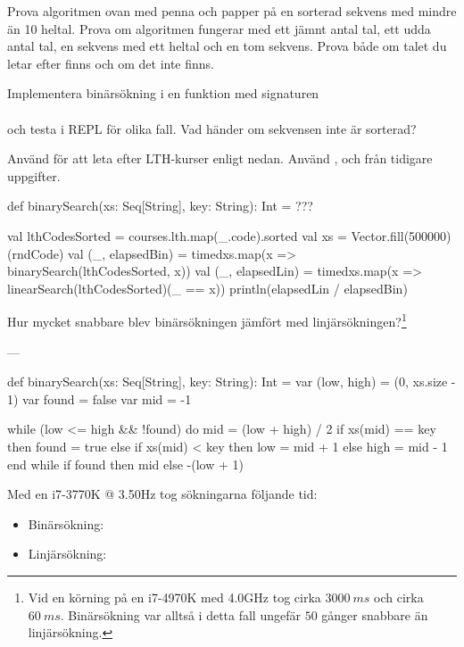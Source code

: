 \Subtask Prova algoritmen ovan med penna och papper på en sorterad sekvens med mindre än 10 heltal. Prova om algoritmen fungerar med ett jämnt antal tal, ett udda antal tal, en sekvens med ett heltal och en tom sekvens. Prova både om talet du letar efter finns och om det inte finns.

\Subtask Implementera binärsökning i en funktion med signaturen\\
\\
och testa i REPL för olika fall. Vad händer om sekvensen inte är sorterad?

\Subtask Använd  för att leta efter LTH-kurser enligt nedan. Använd ,  och  från tidigare uppgifter.
\begin{Code}
def binarySearch(xs: Seq[String], key: String): Int = ???

val lthCodesSorted = courses.lth.map(_.code).sorted
val xs = Vector.fill(500000)(rndCode)
val (_, elapsedBin) =
  timed{xs.map(x => binarySearch(lthCodesSorted, x))}
val (_, elapsedLin) =
  timed{xs.map(x => linearSearch(lthCodesSorted)(_ == x))}
println(elapsedLin / elapsedBin)
\end{Code}


\Subtask Hur mycket snabbare blev binärsökningen jämfört med linjärsökningen?\footnote{Vid en körning på en i7-4970K med 4.0GHz tog  cirka $3000~ms$ och  cirka $60~ms$. Binärsökning var alltså i detta fall ungefär $50$ gånger snabbare än linjärsökning.}


\SOLUTION


\TaskSolved \what


\SubtaskSolved ---

\SubtaskSolved
\begin{Code}
def binarySearch(xs: Seq[String], key: String): Int = 
  var (low, high) = (0, xs.size - 1)
  var found = false
  var mid = -1

  while (low <= high && !found) do
    mid = (low + high) / 2
    if xs(mid) == key then found = true
    else if xs(mid) < key then low = mid + 1
    else high = mid - 1
  end while
  if found then  mid else -(low + 1)
\end{Code}

\SubtaskSolved
Med en i7-3770K @ 3.50Hz tog sökningarna följande tid:

\begin{itemize}
\item Binärsökning: 
\item Linjärsökning: 
\end{itemize}

